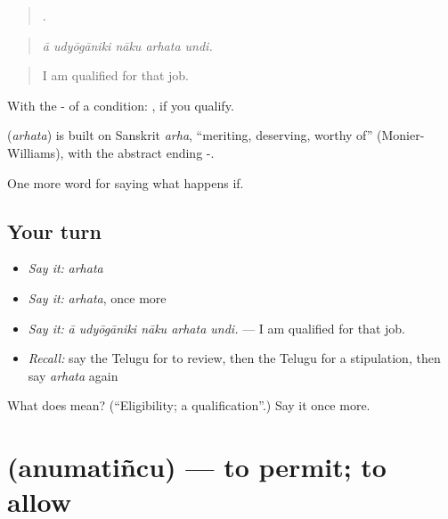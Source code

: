 \begin{quote}
    .
\end{quote}

\begin{quote}
\emph{ā udyōgāniki nāku arhata undi.}
\end{quote}

\begin{quote}
I am qualified for that job.
\end{quote}

With the - of a condition:  , if you qualify.

\begin{cousinweb}
\textbf{} (\emph{arhata}) is built on Sanskrit \emph{arha}, \textquotedblleft{}meriting, deserving, worthy of\textquotedblright{} (Monier-Williams), with the abstract ending -.
\end{cousinweb}

\begin{grammarlens}[title={What you've built}]
One more word for saying what happens if.
\end{grammarlens}

\subsection*{Your turn}
\begin{itemize}
\raggedright
  \item \emph{Say it:} \emph{arhata}
  \item \emph{Say it:} \emph{arhata}, once more
  \item \emph{Say it:} \emph{ā udyōgāniki nāku arhata undi.} — I am qualified for that job.
  \item \emph{Recall:} say the Telugu for to review, then the Telugu for a stipulation, then say \emph{arhata} again
\end{itemize}

\begin{tcolorbox}[breakable,colback=teal!4,colframe=teal!35!black,title={Before you move on}]
What does  mean? (\textquotedblleft{}Eligibility; a qualification\textquotedblright{}.) Say it once more.
\end{tcolorbox}
\section[\texorpdfstring{\te{అనుమతించు} (anumatiñcu)}{అనుమతించు (anumatiñcu)}]{ (anumatiñcu) — to permit; to allow}

